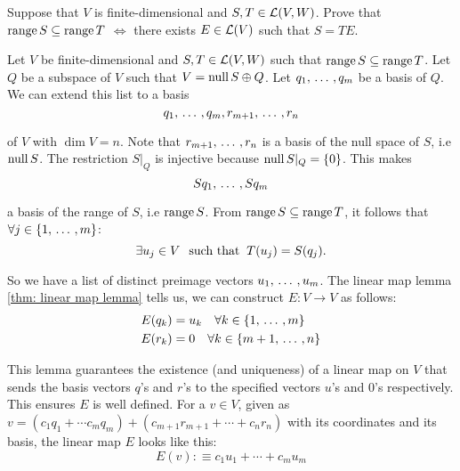 \begin{xrcs}
  Suppose that $V$ is finite-dimensional and $S, T \in \mathcal{L} (V,W)$. Prove that $\operatorname{range} S \subseteq \operatorname{range} T$ $\iff$ there exists $E \in \mathcal{L}(V)$ such that $S=TE$.

  \begin{xprf}
    \Rightarrowdirection Let $V$ be finite-dimensional and $S,T \in \mathcal{L} (V,W)$ such that $\operatorname{range} S \subseteq \operatorname{range} T$. Let $Q$ be a subspace of $V$ such that $V = \operatorname{null} S \oplus Q$. Let $q_1, {\, \ldots \,\,}, q_m$ be a basis of $Q$. We can extend this list to a basis
    \begin{equation}
      q_1, {\, \ldots \,\,}, q_m, r_{m+1}, {\, \ldots \,\,}, r_n
    \end{equation}

    of $V$ with $\dim V = n$. Note that $r_{m+1}, {\, \ldots \,\,}, r_n$ is a basis of the null space of $S$, i.e $\operatorname{null} S$. The restriction $S|_Q$ is injective because $\operatorname{null} S|_Q = \{0\}$. This makes
    \begin{equation}
      S q_1, {\, \ldots \,\,}, S q_m
    \end{equation}

    a basis of the range of $S$, i.e $\operatorname{range} S$.
    From $\operatorname{range} S \subseteq \operatorname{range} T$, it follows that $\forall j \in \{1, {\, \ldots \,\,}, m\}$:
    \begin{equation}
      \exists u_j \in V \;\;\, \text{such that}\;\; T(u_j) = S (q_j).
    \end{equation}

    So we have a list of distinct preimage vectors $u_1, {\, \ldots \,\,}, u_m$. The linear map lemma \ref{thm: linear map lemma} tells us, we can construct $E: V \to V$ as follows:
    \begin{equation}
      \label{eq: definition of E}
      \begin{aligned}
        E(q_k) &= u_k \quad \forall k \in \{1, {\, \ldots \,\,}, m\} \\
        E(r_k) &= 0 \quad \forall k \in \{m+1, {\, \ldots \,\,}, n\}
      \end{aligned}
    \end{equation}

    This lemma guarantees the existence (and uniqueness) of a linear map on $V$ that sends the basis vectors $q$'s and $r$'s to the specified vectors $u$'s and $0$'s respectively.
    This ensures $E$ is well defined.
    For a $v \in V$, given as $v= (c_1 q_1 + \cdots c_m q_m) + (c_{m+1} r_{m+1} + \cdots + c_n r_n)$ with its coordinates and its basis, the linear map $E$ looks like this:
    \begin{equation}
      E(v) :\equiv c_1 u_1 + \cdots + c_m u_m
    \end{equation}


\end{xprf}
\end{xrcs}
